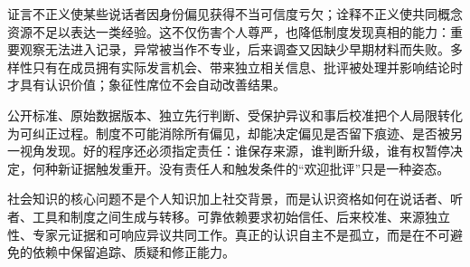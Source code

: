 证言不正义使某些说话者因身份偏见获得不当可信度亏欠；诠释不正义使共同概念资源不足以表达一类经验\parencite{fricker2007}。这不仅伤害个人尊严，也降低制度发现真相的能力：重要观察无法进入记录，异常被当作不专业，后来调查又因缺少早期材料而失败。多样性只有在成员拥有实际发言机会、带来独立相关信息、批评被处理并影响结论时才具有认识价值；象征性席位不会自动改善结果。

公开标准、原始数据版本、独立先行判断、受保护异议和事后校准把个人局限转化为可纠正过程\parencite{longino1990}。制度不可能消除所有偏见，却能决定偏见是否留下痕迹、是否被另一视角发现。好的程序还必须指定责任：谁保存来源，谁判断升级，谁有权暂停决定，何种新证据触发重开。没有责任人和触发条件的“欢迎批评”只是一种姿态。

社会知识的核心问题不是个人知识加上社交背景，而是认识资格如何在说话者、听者、工具和制度之间生成与转移。可靠依赖要求初始信任、后来校准、来源独立性、专家元证据和可响应异议共同工作。真正的认识自主不是孤立，而是在不可避免的依赖中保留追踪、质疑和修正能力。
